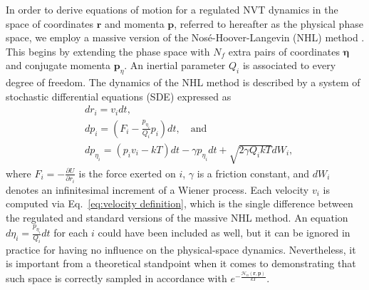 \documentclass[
aip,
jcp,
reprint,
]{revtex4-1}
\newcommand{\vt}[1]{\boldsymbol{\mathbf{#1}}}          %
\newcommand{\diff}[2]{\frac{\partial #2}{\partial #1}} %
\newcommand{\nn}{n}
\begin{document}
In order to derive equations of motion for a regulated NVT dynamics in the space of coordinates $\vt r$ and momenta $\vt p$, referred to hereafter as the physical phase space, we employ a massive version of the Nos\'{e}-Hoover-Langevin (NHL) method \cite{Samoletov_2007, Leimkuhler_2009}.
This begins by extending the phase space with $N_f$ extra pairs of coordinates $\vt \eta$ and conjugate momenta $\vt p_\eta$.
An inertial parameter $Q_i$ is associated to every degree of freedom.
The dynamics of the NHL method is described by a system of stochastic differential equations (SDE) expressed as
\begin{subequations}
	\label{eq:regulated massive NHL equations}
	\begin{align}
	&dr_i = v_i dt, \\
	&dp_i = \left(F_i - \frac{p_{\eta_i}}{Q_i} p_i\right) dt, \quad \mathrm{and} \\
	&dp_{\eta_i} = (p_i v_i - kT) dt - \gamma p_{\eta_i} dt + \sqrt{2 \gamma Q_i kT} dW_i,
	\end{align}
\end{subequations}
where $F_i = -\diff{r_i}{U}$ is the force exerted on $i$,
$\gamma$ is a friction constant, and
$dW_i$ denotes an infinitesimal increment of a Wiener process.
Each velocity $v_i$ is computed via Eq.~\eqref{eq:velocity definition}, which is the single difference between the regulated and standard versions of the massive NHL method.
An equation $d\eta_i = \frac{p_{\eta_i}}{Q_i} dt$ for each $i$ could have been included as well, but it can be ignored in practice for having no influence on the physical-space dynamics.
Nevertheless, it is important from a theoretical standpoint when it comes to demonstrating that such space is correctly sampled in accordance with $e^{-\frac{\mathcal{H}_\nn(\vt r, \vt p)}{kT}}$.
\end{document}
